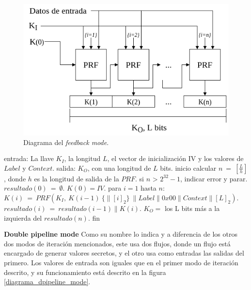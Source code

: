 \begin{figure}[H]
  \begin{center}
    \includegraphics[width=0.75\linewidth]{diagramas/feedback_mode}
    \caption{Diagrama del \textit{feedback mode}.}
    \label{diagrama_feedback_mode}
   \end{center}
\end{figure}

\begin{pseudocodigo}[caption={Funcionamiento del \textit{feedback mode}.}, 
label={mi:2}]
  entrada:   La llave $K_I$, la longitud $L$, el vector de inicialización IV 
             y los valores de $Label$ y $Context$.
  salida:    $K_O$, con una longitud de $L$ bits.
  inicio
    calcular $n\: =\: [\frac{L}{h}]$, donde $h$ es la longitud de salida de la $PRF$.
    si $n$ > $2^{32}-1$, indicar error y parar.
    $resultado(0)\: =\: \emptyset$.
    $K(0) = IV$.
    para $i=1$ hasta $n$:
      $K(i)\: = \:PRF(K_I,\: K(i-1)\: \{\parallel {[i]}_2\}\: \parallel Label \parallel 0x00 \parallel Context \parallel {[L]}_2 )$.
      $resultado(i)\: =\: resultado(i-1) \parallel K(i)$.
    $K_O =$ los L bits más a la izquierda del $resultado(n)$. 
  fin
\end{pseudocodigo}

\textbf{Double pipeline mode}
Como su nombre lo indica y a diferencia de los otros dos modos de iteración 
mencionados, este usa dos flujos, donde un flujo está encargado de generar 
valores secretos, y el otro usa como entradas las salidas del primero.
Los valores de entrada son iguales que en el primer modo de iteración descrito, 
y su funcionamiento está descrito en la figura \ref{diagrama_dpipeline_mode}.

